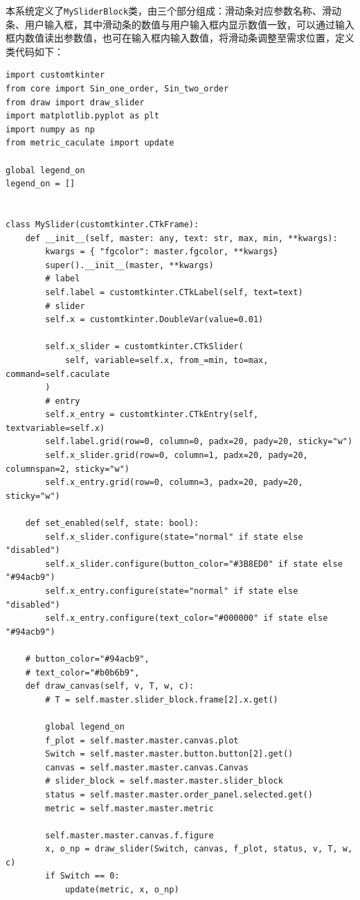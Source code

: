 \documentclass[12pt]{ctexart}
\begin{document}
本系统定义了\texttt{MySliderBlock}类，由三个部分组成：滑动条对应参数名称、滑动条、用户输入框，其中滑动条的数值与用户输入框内显示数值一致，可以通过输入框内数值读出参数值，也可在输入框内输入数值，将滑动条调整至需求位置，定义类代码如下：
\begin{lstlisting}[title=MySliderBlock 类代码]
import customtkinter
from core import Sin_one_order, Sin_two_order
from draw import draw_slider
import matplotlib.pyplot as plt
import numpy as np
from metric_caculate import update

global legend_on
legend_on = []


class MySlider(customtkinter.CTkFrame):
    def __init__(self, master: any, text: str, max, min, **kwargs):
        kwargs = { "fgcolor": master.fgcolor, **kwargs}
        super().__init__(master, **kwargs)
        # label
        self.label = customtkinter.CTkLabel(self, text=text)
        # slider
        self.x = customtkinter.DoubleVar(value=0.01)

        self.x_slider = customtkinter.CTkSlider(
            self, variable=self.x, from_=min, to=max, command=self.caculate
        )
        # entry
        self.x_entry = customtkinter.CTkEntry(self, textvariable=self.x)
        self.label.grid(row=0, column=0, padx=20, pady=20, sticky="w")
        self.x_slider.grid(row=0, column=1, padx=20, pady=20, columnspan=2, sticky="w")
        self.x_entry.grid(row=0, column=3, padx=20, pady=20, sticky="w")

    def set_enabled(self, state: bool):
        self.x_slider.configure(state="normal" if state else "disabled")
        self.x_slider.configure(button_color="#3B8ED0" if state else "#94acb9")
        self.x_entry.configure(state="normal" if state else "disabled")
        self.x_entry.configure(text_color="#000000" if state else "#94acb9")

    # button_color="#94acb9",
    # text_color="#b0b6b9",
    def draw_canvas(self, v, T, w, c):
        # T = self.master.slider_block.frame[2].x.get()

        global legend_on
        f_plot = self.master.master.canvas.plot
        Switch = self.master.master.button.button[2].get()
        canvas = self.master.master.canvas.Canvas
        # slider_block = self.master.master.slider_block
        status = self.master.master.order_panel.selected.get()
        metric = self.master.master.metric

        self.master.master.canvas.f.figure
        x, o_np = draw_slider(Switch, canvas, f_plot, status, v, T, w, c)
        if Switch == 0:
            update(metric, x, o_np)


\end{lstlisting}
\end{document}
